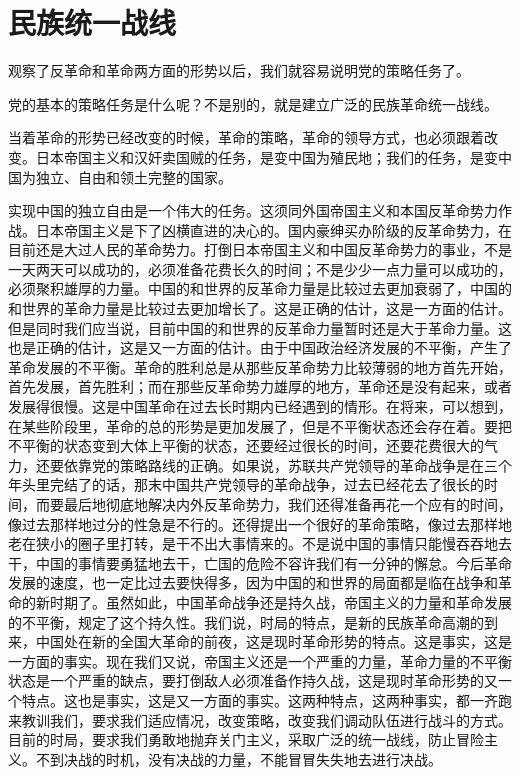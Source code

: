 \section{民族统一战线}

观察了反革命和革命两方面的形势以后，我们就容易说明党的策略任务了。

党的基本的策略任务是什么呢？不是别的，就是建立广泛的民族革命统一战线。

当着革命的形势已经改变的时候，革命的策略，革命的领导方式，也必须跟着改变。日本帝国主义和汉奸卖国贼的任务，是变中国为殖民地；我们的任务，是变中国为独立、自由和领土完整的国家。

实现中国的独立自由是一个伟大的任务。这须同外国帝国主义和本国反革命势力作战。日本帝国主义是下了凶横直进的决心的。国内豪绅买办阶级的反革命势力，在目前还是大过人民的革命势力。打倒日本帝国主义和中国反革命势力的事业，不是一天两天可以成功的，必须准备花费长久的时间；不是少少一点力量可以成功的，必须聚积雄厚的力量。中国的和世界的反革命力量是比较过去更加衰弱了，中国的和世界的革命力量是比较过去更加增长了。这是正确的估计，这是一方面的估计。但是同时我们应当说，目前中国的和世界的反革命力量暂时还是大于革命力量。这也是正确的估计，这是又一方面的估计。由于中国政治经济发展的不平衡，产生了革命发展的不平衡。革命的胜利总是从那些反革命势力比较薄弱的地方首先开始，首先发展，首先胜利；而在那些反革命势力雄厚的地方，革命还是没有起来，或者发展得很慢。这是中国革命在过去长时期内已经遇到的情形。在将来，可以想到，在某些阶段里，革命的总的形势是更加发展了，但是不平衡状态还会存在着。要把不平衡的状态变到大体上平衡的状态，还要经过很长的时间，还要花费很大的气力，还要依靠党的策略路线的正确。如果说，苏联共产党领导的革命战争是在三个年头里完结了的话，那末中国共产党领导的革命战争，过去已经花去了很长的时间，而要最后地彻底地解决内外反革命势力，我们还得准备再花一个应有的时间，像过去那样地过分的性急是不行的。还得提出一个很好的革命策略，像过去那样地老在狭小的圈子里打转，是干不出大事情来的。不是说中国的事情只能慢吞吞地去干，中国的事情要勇猛地去干，亡国的危险不容许我们有一分钟的懈怠。今后革命发展的速度，也一定比过去要快得多，因为中国的和世界的局面都是临在战争和革命的新时期了。虽然如此，中国革命战争还是持久战，帝国主义的力量和革命发展的不平衡，规定了这个持久性。我们说，时局的特点，是新的民族革命高潮的到来，中国处在新的全国大革命的前夜，这是现时革命形势的特点。这是事实，这是一方面的事实。现在我们又说，帝国主义还是一个严重的力量，革命力量的不平衡状态是一个严重的缺点，要打倒敌人必须准备作持久战，这是现时革命形势的又一个特点。这也是事实，这是又一方面的事实。这两种特点，这两种事实，都一齐跑来教训我们，要求我们适应情况，改变策略，改变我们调动队伍进行战斗的方式。目前的时局，要求我们勇敢地抛弃关门主义，采取广泛的统一战线，防止冒险主义。不到决战的时机，没有决战的力量，不能冒冒失失地去进行决战。

